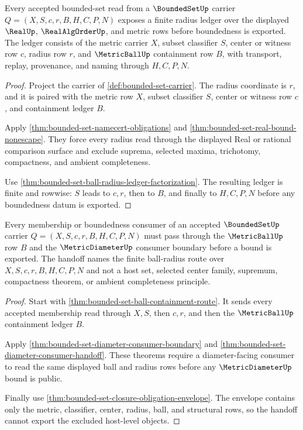 \begin{theorem}
\label{thm:bounded-set-radius-ledger}
Every accepted bounded-set read from a $\BoundedSetUp$ carrier $Q=(X,S,c,r,B,H,C,P,N)$ exposes a finite radius ledger over the displayed $\RealUp$, $\RealAlgOrderUp$, and metric rows before boundedness is exported. The ledger consists of the metric carrier $X$, subset classifier $S$, center or witness row $c$, radius row $r$, and $\MetricBallUp$ containment row $B$, with transport, replay, provenance, and naming through $H,C,P,N$.
\end{theorem}
\begin{proof}
Project the carrier of \autoref{def:bounded-set-carrier}. The radius coordinate is $r$, and it is paired with the metric row $X$, subset classifier $S$, center or witness row $c$, and containment ledger $B$.

Apply \autoref{thm:bounded-set-namecert-obligations} and \autoref{thm:bounded-set-real-bound-nonescape}. They force every radius read through the displayed Real or rational comparison surface and exclude suprema, selected maxima, trichotomy, compactness, and ambient completeness.

Use \autoref{thm:bounded-set-ball-radius-ledger-factorization}. The resulting ledger is finite and rowwise: $S$ leads to $c,r$, then to $B$, and finally to $H,C,P,N$ before any boundedness datum is exported.
\end{proof}

\begin{theorem}
\label{thm:bounded-set-metric-ball-handoff}
Every membership or boundedness consumer of an accepted $\BoundedSetUp$ carrier $Q=(X,S,c,r,B,H,C,P,N)$ must pass through the $\MetricBallUp$ row $B$ and the $\MetricDiameterUp$ consumer boundary before a bound is exported. The handoff names the finite ball-radius route over $X,S,c,r,B,H,C,P,N$ and not a host set, selected center family, supremum, compactness theorem, or ambient completeness principle.
\end{theorem}
\begin{proof}
Start with \autoref{thm:bounded-set-ball-containment-route}. It sends every accepted membership read through $X,S$, then $c,r$, and then the $\MetricBallUp$ containment ledger $B$.

Apply \autoref{thm:bounded-set-diameter-consumer-boundary} and \autoref{thm:bounded-set-diameter-consumer-handoff}. These theorems require a diameter-facing consumer to read the same displayed ball and radius rows before any $\MetricDiameterUp$ bound is public.

Finally use \autoref{thm:bounded-set-closure-obligation-envelope}. The envelope contains only the metric, classifier, center, radius, ball, and structural rows, so the handoff cannot export the excluded host-level objects.
\end{proof}

